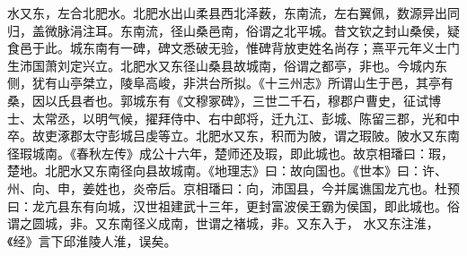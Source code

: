 \documentclass[12pt,UTF8]{ctexbook}
\begin{document}
水又东，左合北肥水。北肥水出山柔县西北泽薮，东南流，左右翼佩，数源异出同归，盖微脉涓注耳。东南流，径山桑邑南，俗谓之北平城。昔文钦之封山桑侯，疑食邑于此。城东南有一碑，碑文悉破无验，惟碑背放吏姓名尚存；熹平元年义士门生沛国萧刘定兴立。北肥水又东径山桑县故城南，俗谓之都亭，非也。今城内东侧，犹有山亭桀立，陵阜高峻，非洪台所拟。《十三州志》所谓山生于邑，其亭有桑，因以氏县者也。郭城东有《文穆冢碑》，三世二千石，穆郡户曹史，征试博士、太常丞，以明气候，擢拜侍中、右中郎将，迁九江、彭城、陈留三郡，光和中卒。故吏涿郡太守彭城吕虔等立。北肥水又东，积而为陂，谓之瑕陂。陂水又东南径瑕城南。《春秋左传》成公十六年，楚师还及瑕，即此城也。故京相璠曰：瑕，楚地。北肥水又东南径向县故城南。《地理志》曰：故向国也。《世本》曰：许、州、向、申，姜姓也，炎帝后。京相璠曰：向，沛国县，今并属谯国龙亢也。杜预曰：龙亢县东有向城，汉世祖建武十三年，更封富波侯王霸为侯国，即此城也。俗谓之圆城，非。又东南径义成南，世谓之褚城，非。又东入于， 水又东注淮，《经》言下邱淮陵人淮，误矣。
\end{document}
